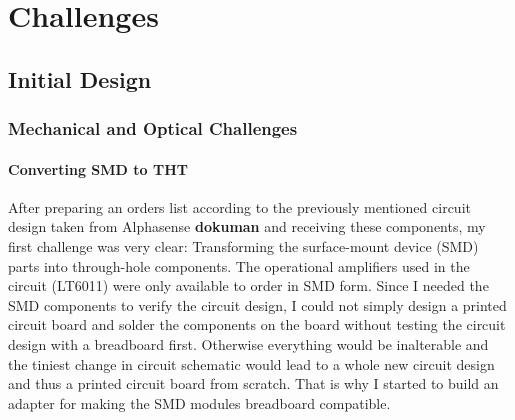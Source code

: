 \chapter{Challenges}
\label{sec:challenges}


\section{Initial Design}
\subsection{Mechanical and Optical Challenges}
\label{sub:mechanicalChallenges}

\subsubsection{Converting SMD to THT}
After preparing an orders list according to the previously mentioned circuit design taken from Alphasense \textbf{dokuman} and receiving these components, my first challenge was very clear: Transforming the surface-mount device (SMD) parts into through-hole components. The operational amplifiers used in the circuit (LT6011) were only available to order in SMD form. Since I needed the SMD components to verify the circuit design, I could not simply design a printed circuit board and solder the components on the board without testing the circuit design with a breadboard first. Otherwise everything would be inalterable and the tiniest change in circuit schematic would lead to a whole new circuit design and thus a printed circuit board from scratch. That is why I started to build an adapter for making the SMD modules breadboard compatible. \par 
